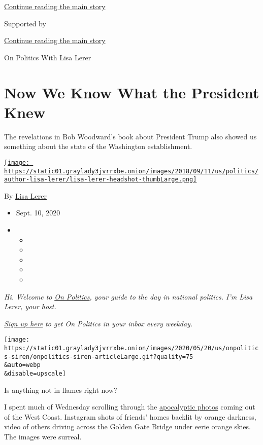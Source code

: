 \protect\hyperlink{after-top}{Continue reading the main story}

Supported by

\protect\hyperlink{after-sponsor}{Continue reading the main story}

On Politics With Lisa Lerer

\hypertarget{now-we-know-what-the-president-knew}{%
\section{Now We Know What the President
Knew}\label{now-we-know-what-the-president-knew}}

The revelations in Bob Woodward's book about President Trump also showed
us something about the state of the Washington establishment.

\href{https://www.nytimes3xbfgragh.onion/by/lisa-lerer}{\texttt{[image: https://static01.graylady3jvrrxbe.onion/images/2018/09/11/us/politics/author-lisa-lerer/lisa-lerer-headshot-thumbLarge.png]}}

By \href{https://www.nytimes3xbfgragh.onion/by/lisa-lerer}{Lisa Lerer}

\begin{itemize}
\item
  Sept. 10, 2020
\item
  \begin{itemize}
  \item
  \item
  \item
  \item
  \item
  \end{itemize}
\end{itemize}

\emph{Hi. Welcome to}
\href{https://www.nytimes3xbfgragh.onion/spotlight/on-politics}{\emph{On
Politics}}\emph{, your guide to the day in national politics. I'm Lisa
Lerer, your host.}

\href{https://www.nytimes3xbfgragh.onion/newsletters/politics?module=inline}{\emph{Sign
up here}} \emph{to get On Politics in your inbox every weekday.}

\texttt{[image: https://static01.graylady3jvrrxbe.onion/images/2020/05/20/us/onpolitics-siren/onpolitics-siren-articleLarge.gif?quality=75\\\&auto=webp\\\&disable=upscale]}

Is anything not in flames right now?

I spent much of Wednesday scrolling through the
\href{https://www.nytimes3xbfgragh.onion/2020/09/09/us/pictures-photos-california-fires.html}{apocalyptic
photos} coming out of the West Coast. Instagram shots of friends' homes
backlit by orange darkness, video of others driving across the Golden
Gate Bridge under eerie orange skies. The images were surreal.

